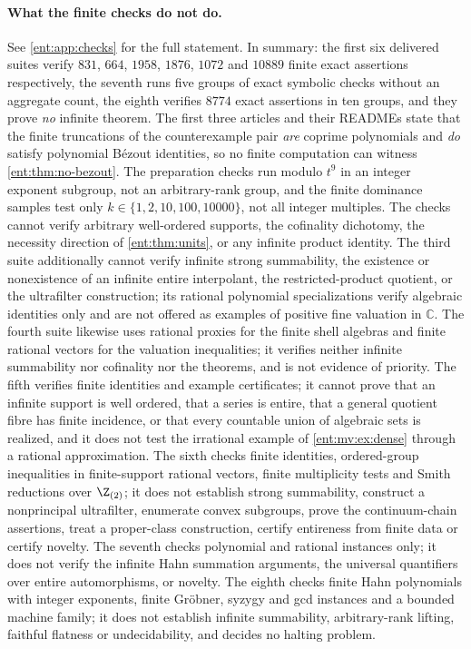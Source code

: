 \documentclass[11pt]{article}
\theoremstyle{plain}
\theoremstyle{plain}
\theoremstyle{plain}
\theoremstyle{definition}
\theoremstyle{definition}
\theoremstyle{definition}
\theoremstyle{definition}
\theoremstyle{remark}
\newcommand{\C}{\mathbb C}\newcommand{\R}{\mathbb R}
\begin{document}
\paragraph{What the finite checks do not do.}
See \cref{ent:app:checks} for the full statement. In summary: the first six
delivered suites verify $831$, $664$, $1958$, $1876$, $1072$ and $10889$
finite exact assertions respectively, the seventh runs five groups of exact
symbolic checks without an aggregate count, the eighth verifies $8774$ exact
assertions in ten groups, and they prove \emph{no} infinite
theorem. The first
three articles and their READMEs state that the finite truncations of the
counterexample pair \emph{are} coprime polynomials and \emph{do} satisfy
polynomial B\'ezout identities, so no finite computation can witness
\cref{ent:thm:no-bezout}. The preparation checks run modulo $t^9$ in an
integer exponent subgroup, not an arbitrary-rank group, and the finite
dominance samples test only $k\in\{1,2,10,100,10000\}$, not all integer
multiples. The checks cannot verify arbitrary well-ordered supports, the
cofinality dichotomy, the necessity direction of \cref{ent:thm:units}, or any
infinite product identity. The third suite additionally cannot verify
infinite strong summability, the existence or nonexistence of an infinite
entire interpolant, the restricted-product quotient, or the ultrafilter
construction; its rational polynomial specializations verify algebraic
identities only and are not offered as examples of positive fine valuation in
$\C$. The fourth suite likewise uses rational proxies for the finite shell
algebras and finite rational vectors for the valuation inequalities; it
verifies neither infinite summability nor cofinality nor the theorems, and
is not evidence of priority. The fifth verifies finite identities and
example certificates; it cannot prove that an infinite support is well
ordered, that a series is entire, that a general quotient fibre has finite
incidence, or that every countable union of algebraic sets is realized, and
it does not test the irrational example of \cref{ent:mv:ex:dense} through a
rational approximation. The sixth checks finite identities, ordered-group
inequalities in finite-support rational vectors, finite multiplicity tests
and Smith reductions over $\Z_{(2)}$; it does not establish strong
summability, construct a nonprincipal ultrafilter, enumerate convex
subgroups, prove the continuum-chain assertions, treat a proper-class
construction, certify entireness from finite data or certify novelty. The
seventh checks polynomial and rational instances only; it does not verify the
infinite Hahn summation arguments, the universal quantifiers over entire
automorphisms, or novelty. The
eighth checks finite Hahn polynomials with integer exponents, finite
Gr\"obner, syzygy and gcd instances and a bounded machine family; it does not
establish infinite summability, arbitrary-rank lifting, faithful flatness or
undecidability, and decides no halting problem.
\end{document}
